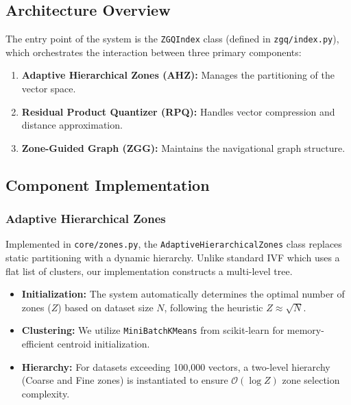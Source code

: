 \documentclass[conference]{IEEEtran}
\begin{document}
\subsection{Architecture Overview}
The entry point of the system is the \texttt{ZGQIndex} class (defined in \texttt{zgq/index.py}), which orchestrates the interaction between three primary components:
\begin{enumerate}
    \item \textbf{Adaptive Hierarchical Zones (AHZ):} Manages the partitioning of the vector space.
    \item \textbf{Residual Product Quantizer (RPQ):} Handles vector compression and distance approximation.
    \item \textbf{Zone-Guided Graph (ZGG):} Maintains the navigational graph structure.
\end{enumerate}

\subsection{Component Implementation}

\subsubsection{Adaptive Hierarchical Zones}
Implemented in \texttt{core/zones.py}, the \texttt{AdaptiveHierarchicalZones} class replaces static partitioning with a dynamic hierarchy. Unlike standard IVF which uses a flat list of clusters, our implementation constructs a multi-level tree.
\begin{itemize}
    \item \textbf{Initialization:} The system automatically determines the optimal number of zones ($Z$) based on dataset size $N$, following the heuristic $Z \approx \sqrt{N}$.
    \item \textbf{Clustering:} We utilize \texttt{MiniBatchKMeans} from scikit-learn for memory-efficient centroid initialization.
    \item \textbf{Hierarchy:} For datasets exceeding 100,000 vectors, a two-level hierarchy (Coarse and Fine zones) is instantiated to ensure $\mathcal{O}(\log Z)$ zone selection complexity.
\end{itemize}
\end{document}
